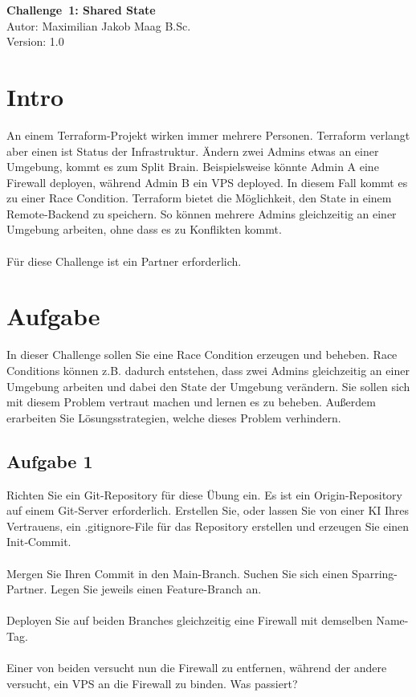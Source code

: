 \documentclass{article}
\begin{document}
    \begin{center}
        \Large \textbf{Challenge 1: Shared State} \\ [6pt]
        \normalsize
        Autor: Maximilian Jakob Maag B.Sc. \\
        Version: 1.0
    \end{center}
    \section{Intro}
    An einem Terraform-Projekt wirken immer mehrere Personen.
    Terraform verlangt aber einen ist Status der Infrastruktur. Ändern zwei Admins etwas an einer Umgebung, kommt es zum Split Brain.
    Beispielsweise könnte Admin A eine Firewall deployen, während Admin B ein VPS deployed. In diesem Fall kommt es zu einer Race Condition.
    Terraform bietet die Möglichkeit, den State in einem Remote‑Backend zu speichern. So können mehrere Admins gleichzeitig an einer Umgebung arbeiten, ohne dass es zu Konflikten kommt.
    \\ \\
    Für diese Challenge ist ein Partner erforderlich.

    \section{Aufgabe}
    In dieser Challenge sollen Sie eine Race Condition erzeugen und beheben.
    Race Conditions können z.B. dadurch entstehen, dass zwei Admins gleichzeitig an einer Umgebung arbeiten und dabei den State der Umgebung verändern.
    Sie sollen sich mit diesem Problem vertraut machen und lernen es zu beheben. Außerdem erarbeiten Sie Lösungsstrategien, welche dieses Problem verhindern.

    \subsection{Aufgabe 1}
    Richten Sie ein Git-Repository für diese Übung ein. Es ist ein Origin-Repository auf einem Git-Server erforderlich.
    Erstellen Sie, oder lassen Sie von einer KI Ihres Vertrauens, ein .gitignore-File für das Repository erstellen und erzeugen Sie einen Init‑Commit.
    \\ \\
    Mergen Sie Ihren Commit in den Main-Branch. Suchen Sie sich einen Sparring-Partner. Legen Sie jeweils einen Feature-Branch an. \\ \\
    Deployen Sie auf beiden Branches gleichzeitig eine Firewall mit demselben Name-Tag. \\ \\
    Einer von beiden versucht nun die Firewall zu entfernen, während der andere versucht, ein VPS an die Firewall zu binden. Was passiert?
\end{document}
